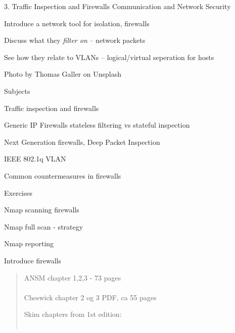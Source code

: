 \documentclass[Screen16to9,17pt]{foils}
\begin{document}
\mytitlepage
{3. Traffic Inspection and Firewalls}
{Communication and Network Security \the\year}




\begin{list2}
\item Introduce a network tool for isolation, firewalls
\item Discuss what they \emph{filter on} -- network packets
\item See how they relate to VLANs -- logical/virtual seperation for hosts
\end{list2}

{\small \hfill Photo by Thomas Galler on Unsplash}



\begin{list1}
\item Subjects
\begin{list2}
\item Traffic inspection and firewalls
\item Generic IP Firewalls stateless filtering vs stateful inspection
\item Next Generation firewalls, Deep Packet Inspection
\item IEEE 802.1q VLAN
\item Common countermeasures in firewalls
\end{list2}
\item Exercises
\begin{list2}
\item Nmap scanning firewalls
\item Nmap full scan - strategy
\item Nmap reporting
\end{list2}
\end{list1}

\centerline{\LARGE Introduce firewalls}


\begin{quote}
ANSM chapter 1,2,3 - 73 pages\\
\\
 Cheswick chapter 2 og 3 PDF, ca 55 pages
\item Skim chapters from 1st edition:\\
\\ 
\end{quote}
\end{document}
